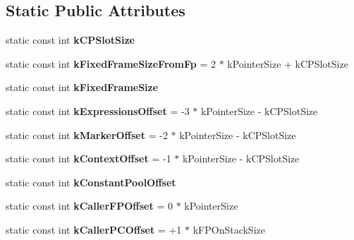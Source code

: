 \subsection*{Static Public Attributes}
\begin{DoxyCompactItemize}
\item 
static const int {\bfseries k\+C\+P\+Slot\+Size}
\item 
\hypertarget{classv8_1_1internal_1_1_standard_frame_constants_a0db002458129602ffa3d7ca1f7ed7b48}{}static const int {\bfseries k\+Fixed\+Frame\+Size\+From\+Fp} = 2 $\ast$ k\+Pointer\+Size + k\+C\+P\+Slot\+Size\label{classv8_1_1internal_1_1_standard_frame_constants_a0db002458129602ffa3d7ca1f7ed7b48}

\item 
static const int {\bfseries k\+Fixed\+Frame\+Size}
\item 
\hypertarget{classv8_1_1internal_1_1_standard_frame_constants_a824ec6353b1bd4638452f51705bbf1fd}{}static const int {\bfseries k\+Expressions\+Offset} = -\/3 $\ast$ k\+Pointer\+Size -\/ k\+C\+P\+Slot\+Size\label{classv8_1_1internal_1_1_standard_frame_constants_a824ec6353b1bd4638452f51705bbf1fd}

\item 
\hypertarget{classv8_1_1internal_1_1_standard_frame_constants_ad67611fd3869686e61c10ec942eaee05}{}static const int {\bfseries k\+Marker\+Offset} = -\/2 $\ast$ k\+Pointer\+Size -\/ k\+C\+P\+Slot\+Size\label{classv8_1_1internal_1_1_standard_frame_constants_ad67611fd3869686e61c10ec942eaee05}

\item 
\hypertarget{classv8_1_1internal_1_1_standard_frame_constants_a485e03f4ddb7fa049c0aaffb8c7115cf}{}static const int {\bfseries k\+Context\+Offset} = -\/1 $\ast$ k\+Pointer\+Size -\/ k\+C\+P\+Slot\+Size\label{classv8_1_1internal_1_1_standard_frame_constants_a485e03f4ddb7fa049c0aaffb8c7115cf}

\item 
static const int {\bfseries k\+Constant\+Pool\+Offset}
\item 
\hypertarget{classv8_1_1internal_1_1_standard_frame_constants_aedd3585c71f038f6032e314f1fc3363e}{}static const int {\bfseries k\+Caller\+F\+P\+Offset} = 0 $\ast$ k\+Pointer\+Size\label{classv8_1_1internal_1_1_standard_frame_constants_aedd3585c71f038f6032e314f1fc3363e}

\item 
\hypertarget{classv8_1_1internal_1_1_standard_frame_constants_a99299f727720d3f338790608b789b520}{}static const int {\bfseries k\+Caller\+P\+C\+Offset} = +1 $\ast$ k\+F\+P\+On\+Stack\+Size\label{classv8_1_1internal_1_1_standard_frame_constants_a99299f727720d3f338790608b789b520}


\end{DoxyCompactItemize}
